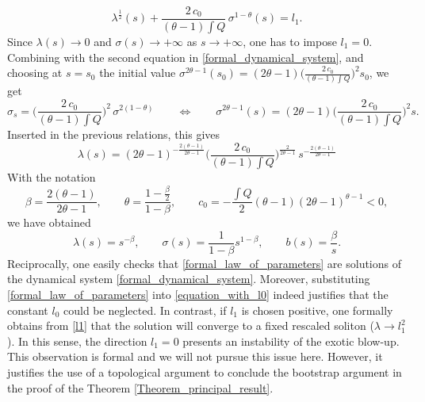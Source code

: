 \documentclass[16pt,english, oneside,reqno]{smfart}
\begin{document}
\begin{enumerate}
\begin{equation}
        \lambda^{\frac 12}(s) + \frac{2\,c_0}{(\theta -1)\int Q}\,\sigma^{1-\theta}(s) = l_1.
    \end{equation}
   Since $\lambda(s)\to 0$ and $\sigma(s)\to +\infty$ as $s\to +\infty$, one has to impose
   $l_1=0$.
    Combining with the second equation in \eqref{formal_dynamical_system}, and choosing at
    $s=s_0$ the initial value $\sigma^{2\theta -1}(s_0) = (2\theta-1)\Big( \frac{2\,c_0}{(\theta -1 )\int Q}\Big)^2s
    _0$, we get 
    \begin{equation}
        \sigma_s = \Big( \frac{2\,c_0}{(\theta -1 )\int Q}\Big)^2\,\sigma^{2(1-\theta)} \qquad \iff \qquad \sigma^{2\theta -1}(s) = (2\theta-1)\Big( \frac{2\,c_0}{(\theta -1 )\int Q}\Big)^2 s.
    \end{equation}
    Inserted in the previous relations, this gives
    \begin{equation}
        \lambda(s) = (2\theta - 1)^{-\frac{2(\theta-1)}{2\theta-1}}\Big( \frac{2\,c_0}{(\theta-1)\int Q} \Big)^{\frac{2}{2\theta-1}}\,s^{-\frac{2(\theta-1)}{2\theta-1}}
    \end{equation}
    With the notation
    \begin{equation}
        \beta = \frac{2(\theta-1)}{2\theta-1}, \qquad \theta = \frac{1-\frac{\beta}{2}}{1-\beta}, \qquad c_0 = -\frac{\int Q}{2}(\theta-1)(2\theta-1)^{\theta-1} < 0,
    \end{equation}
    we have obtained
    \begin{equation}\label{formal_law_of_parameters}
        \lambda(s) = s^{-\beta}, \qquad \sigma(s)= \frac{1}{1-\beta}s^{1-\beta},\qquad b(s)= \frac{\beta}{s}.
    \end{equation}
   Reciprocally, one easily checks that \eqref{formal_law_of_parameters} are solutions of the dynamical system \eqref{formal_dynamical_system}. Moreover, substituting \eqref{formal_law_of_parameters} into \eqref{equation_with_l0} indeed justifies that the constant $l_0$ could be neglected. In contrast, if $l_1$ is chosen positive,
    one formally obtains from \eqref{l1} that the solution will converge to a fixed rescaled soliton ($\lambda\to l_1^2$).
    In this sense, the direction $l_1 = 0$ presents an instability of the exotic blow-up.
    This observation is formal and we will not pursue this issue here.
    However, it justifies the use of a topological argument to conclude the bootstrap argument in the proof of the Theorem \ref{Theorem_principal_result}.
    

\end{enumerate}
\end{document}
